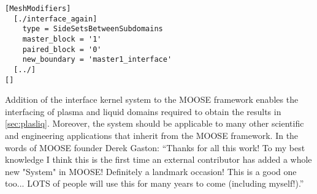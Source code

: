\begin{lstlisting}[caption = Example of how to create a sideset\, in this case 'master1\_interface'\, that can then be used in definition of an interface kernel, label = code:sideset]
[MeshModifiers]
  [./interface_again]
    type = SideSetsBetweenSubdomains
    master_block = '1'
    paired_block = '0'
    new_boundary = 'master1_interface'
  [../]
[]
\end{lstlisting}

Addition of the interface kernel system to the MOOSE framework enables the interfacing of plasma and liquid domains required to obtain the results in \cref{sec:plasliq}. Moreover, the system should be applicable to many other scientific and engineering applications that inherit from the MOOSE framework. In the words of MOOSE founder Derek Gaston: ``Thanks for all this work! To my best knowledge I think this is the first time an external contributor has added a whole new "System" in MOOSE! Definitely a landmark occasion! This is a good one too... LOTS of people will use this for many years to come (including myself!).''
